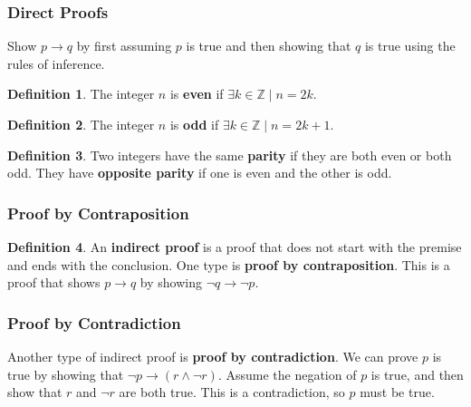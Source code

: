 \documentclass[article, 11pt]{article}
\theoremstyle{definition}
\newtheorem{definition}{Definition}[subsubsection]
\newcommand{\ints}{\mathbb{Z}}
\begin{document}
    \subsubsection{Direct Proofs}
    Show $p \to q$ by first assuming $p$ is true and then showing that $q$ is true using the rules of inference.
    
    \begin{definition}
        The integer $n$ is \textbf{even} if $\exists k \in \ints \mid n = 2k$.
    \end{definition}
    \begin{definition}
        The integer $n$ is \textbf{odd} if $\exists k \in \ints \mid n = 2k + 1$.   
    \end{definition}
    \begin{definition}
        Two integers have the same \textbf{parity} if they are both even or both odd. They have \textbf{opposite parity} if one is even and the other is odd.     
    \end{definition}
    \subsubsection{Proof by Contraposition}
    \begin{definition}
        An \textbf{indirect proof} is a proof that does not start with the premise and ends with the conclusion. One type is \textbf{proof by contraposition}. This is a proof that shows $p \to q$ by showing $\neg q \to \neg p$.   
    \end{definition}
    \subsubsection{Proof by Contradiction}
    Another type of indirect proof is \textbf{proof by contradiction}. 
    We can prove $p$ is true by showing that $\neg p \to (r \land \neg r)$. Assume the negation of $p$ is true, and then show that $r$ and $\neg r$ are both true. This is a contradiction, so $p$ must be true.
    \\
\end{document}
